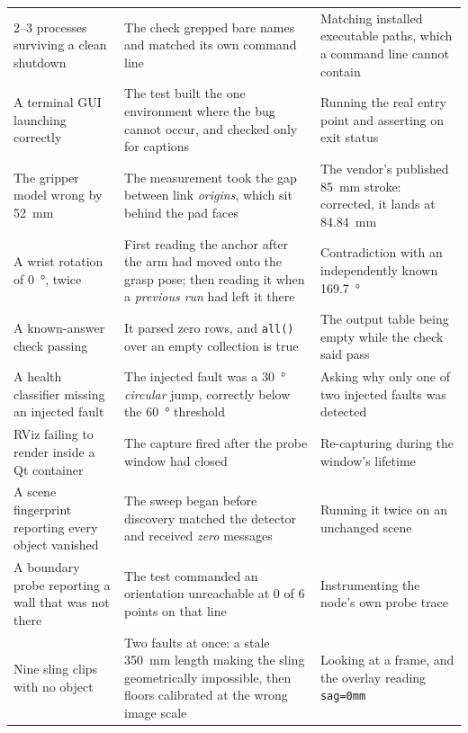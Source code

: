 \begin{table}[htbp]
\begin{tabular}{@{}p{32mm}p{45mm}p{45mm}@{}}
    2--3 processes surviving a clean shutdown
      & The check grepped bare names and matched its own command line
      & Matching installed executable paths, which a command line cannot
        contain \\
    A terminal GUI launching correctly
      & The test built the one environment where the bug cannot occur, and
        checked only for captions
      & Running the real entry point and asserting on exit status \\
    \midrule
    The gripper model wrong by \SI{52}{\milli\metre}
      & The measurement took the gap between link \emph{origins}, which sit
        behind the pad faces
      & The vendor's published \SI{85}{\milli\metre} stroke: corrected, it
        lands at \SI{84.84}{\milli\metre} \\
    A wrist rotation of \SI{0}{\degree}, twice
      & First reading the anchor after the arm had moved onto the grasp pose;
        then reading it when a \emph{previous run} had left it there
      & Contradiction with an independently known \SI{169.7}{\degree} \\
    A known-answer check passing
      & It parsed zero rows, and \texttt{all()} over an empty collection is
        true
      & The output table being empty while the check said pass \\
    A health classifier missing an injected fault
      & The injected fault was a \SI{30}{\degree} \emph{circular} jump,
        correctly below the \SI{60}{\degree} threshold
      & Asking why only one of two injected faults was detected \\
    {RViz} failing to render inside a {Qt} container
      & The capture fired after the probe window had closed
      & Re-capturing during the window's lifetime \\
    A scene fingerprint reporting every object vanished
      & The sweep began before discovery matched the detector and received
        \emph{zero} messages
      & Running it twice on an unchanged scene \\
    A boundary probe reporting a wall that was not there
      & The test commanded an orientation unreachable at 0 of 6 points on that
        line
      & Instrumenting the node's own probe trace \\
    Nine sling clips with no object
      & Two faults at once: a stale \SI{350}{\milli\metre} length making the
        sling geometrically impossible, then floors calibrated at the wrong
        image scale
      & Looking at a frame, and the overlay reading \texttt{sag=0mm} \\
    \bottomrule
  \end{tabular}
\end{table}

